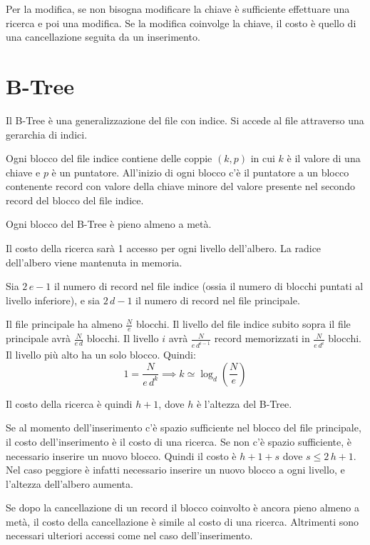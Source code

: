 Per la modifica, se non bisogna modificare la chiave \`e sufficiente effettuare una ricerca e poi una modifica. Se la modifica coinvolge la chiave, il costo \`e quello di una cancellazione seguita da un inserimento.

\section{B-Tree}

Il B-Tree \`e una generalizzazione del file con indice. Si accede al file attraverso una gerarchia di indici.

Ogni blocco del file indice contiene delle coppie $(k,p)$ in cui $k$ \`e il valore di una chiave e $p$ \`e un puntatore. All'inizio di ogni blocco c'\`e il puntatore a un blocco contenente record con valore della chiave minore del valore presente nel secondo record del blocco del file indice.

Ogni blocco del B-Tree \`e pieno almeno a met\`a.

Il costo della ricerca sar\`a 1 accesso per ogni livello dell'albero. La radice dell'albero viene mantenuta in memoria.

Sia $2 \, e - 1$ il numero di record nel file indice (ossia il numero di blocchi puntati al livello inferiore), e sia $2 \, d - 1$ il numero di record nel file principale.

Il file principale ha almeno $\frac{N}{e}$ blocchi. Il livello del file indice subito sopra il file principale avr\`a $\frac{N}{e \, d}$ blocchi. Il livello $i$ avr\`a $\frac{N}{e \, d^{i-1}}$ record memorizzati in $\frac{N}{e \, d^i}$ blocchi. Il livello pi\`u alto ha un solo blocco. Quindi:
\[
1 = \frac{N}{e \, d^k} \implies k \simeq \log_d \left( \frac{N}{e} \right)
\]

Il costo della ricerca \`e quindi $h + 1$, dove $h$ \`e l'altezza del B-Tree.

Se al momento dell'inserimento c'\`e spazio sufficiente nel blocco del file principale, il costo dell'inserimento \`e il costo di una ricerca. Se non c'\`e spazio sufficiente, \`e necessario inserire un nuovo blocco. Quindi il costo \`e $h + 1 + s$ dove $s \le 2 \, h + 1$. Nel caso peggiore \`e infatti necessario inserire un nuovo blocco a ogni livello, e l'altezza dell'albero aumenta.

Se dopo la cancellazione di un record il blocco coinvolto \`e ancora pieno almeno a met\`a, il costo della cancellazione \`e simile al costo di una ricerca. Altrimenti sono necessari ulteriori accessi come nel caso dell'inserimento.

